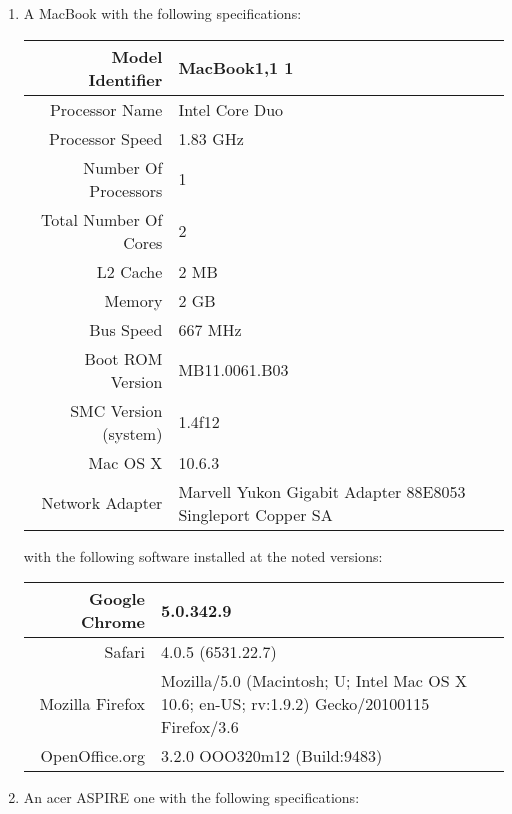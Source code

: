\documentclass[12pt,oneside,letterpaper,titlepage]{article}
\begin{document}
\begin{enumerate}

\item A MacBook with the following specifications:

  \begin{tabular}{| r | p{5cm} |}
    \hline
    Model Identifier      & MacBook1,1 1 \\ \hline
    Processor Name        & Intel Core Duo \\ \hline
    Processor Speed       & 1.83 GHz \\ \hline
    Number Of Processors  & 1 \\ \hline
    Total Number Of Cores & 2 \\ \hline
    L2 Cache              & 2 MB \\ \hline
    Memory                & 2 GB \\ \hline
    Bus Speed             & 667 MHz \\ \hline
    Boot ROM Version      & MB11.0061.B03 \\ \hline
    SMC Version (system)  & 1.4f12 \\ \hline
    Mac OS X              & 10.6.3 \\ \hline
    Network  Adapter      & Marvell Yukon Gigabit Adapter 88E8053 Singleport
                            Copper SA \\
    \hline
  \end{tabular}

  with the following software installed at the noted versions:

  \begin{tabular}{| r | p{5cm} |}
    \hline
    Google Chrome   & 5.0.342.9 \\ \hline
    Safari          & 4.0.5 (6531.22.7) \\ \hline
    Mozilla Firefox & Mozilla/5.0 (Macintosh; U; Intel Mac OS X 10.6; en-US;
    rv:1.9.2) Gecko/20100115 Firefox/3.6 \\ \hline
    OpenOffice.org  & 3.2.0 OOO320m12 (Build:9483) \\
    \hline
  \end{tabular}

\item An acer ASPIRE one with the following specifications:


\end{enumerate}
\end{document}
